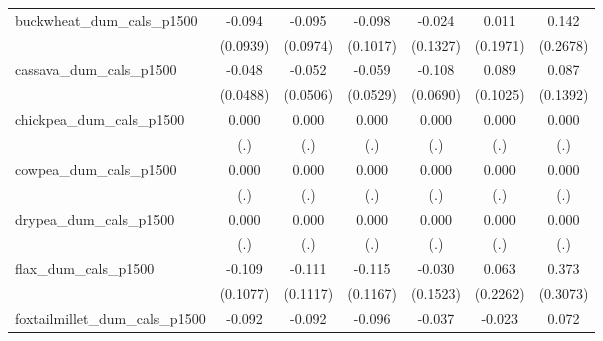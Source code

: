 {\begin{tabular}{l*{6}{c}}
buckwheat\_dum\_cals\_p1500&      -0.094         &      -0.095         &      -0.098         &      -0.024         &       0.011         &       0.142         \\
                    &    (0.0939)         &    (0.0974)         &    (0.1017)         &    (0.1327)         &    (0.1971)         &    (0.2678)         \\
\addlinespace
cassava\_dum\_cals\_p1500&      -0.048         &      -0.052         &      -0.059         &      -0.108         &       0.089         &       0.087         \\
                    &    (0.0488)         &    (0.0506)         &    (0.0529)         &    (0.0690)         &    (0.1025)         &    (0.1392)         \\
\addlinespace
chickpea\_dum\_cals\_p1500&       0.000         &       0.000         &       0.000         &       0.000         &       0.000         &       0.000         \\
                    &         (.)         &         (.)         &         (.)         &         (.)         &         (.)         &         (.)         \\
\addlinespace
cowpea\_dum\_cals\_p1500&       0.000         &       0.000         &       0.000         &       0.000         &       0.000         &       0.000         \\
                    &         (.)         &         (.)         &         (.)         &         (.)         &         (.)         &         (.)         \\
\addlinespace
drypea\_dum\_cals\_p1500&       0.000         &       0.000         &       0.000         &       0.000         &       0.000         &       0.000         \\
                    &         (.)         &         (.)         &         (.)         &         (.)         &         (.)         &         (.)         \\
\addlinespace
flax\_dum\_cals\_p1500 &      -0.109         &      -0.111         &      -0.115         &      -0.030         &       0.063         &       0.373         \\
                    &    (0.1077)         &    (0.1117)         &    (0.1167)         &    (0.1523)         &    (0.2262)         &    (0.3073)         \\
\addlinespace
foxtailmillet\_dum\_cals\_p1500&      -0.092         &      -0.092         &      -0.096         &      -0.037         &      -0.023         &       0.072         \\

\end{tabular}}
